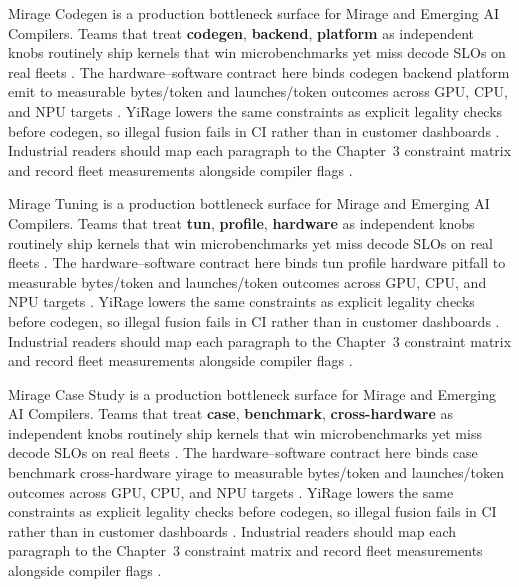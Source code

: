 Mirage Codegen is a production bottleneck surface for Mirage and Emerging AI Compilers. Teams that treat \textbf{codegen}, \textbf{backend}, \textbf{platform} as independent knobs routinely ship kernels that win microbenchmarks yet miss decode SLOs on real fleets \citep{semianalysis2024tma,dlbook}. The hardware--software contract here binds codegen backend platform emit to measurable bytes/token and launches/token outcomes across GPU, CPU, and NPU targets \citep{amd2024xdna,dao2022flashattention}. YiRage lowers the same constraints as explicit legality checks before codegen, so illegal fusion fails in CI rather than in customer dashboards \citep{amd2024aie,kwon2023vllm}. Industrial readers should map each paragraph to the Chapter~3 constraint matrix and record fleet measurements alongside compiler flags \citep{dlbook,nvidia2024cudagraphs}.

Mirage Tuning is a production bottleneck surface for Mirage and Emerging AI Compilers. Teams that treat \textbf{tun}, \textbf{profile}, \textbf{hardware} as independent knobs routinely ship kernels that win microbenchmarks yet miss decode SLOs on real fleets \citep{amd2024xdna,dao2022flashattention}. The hardware--software contract here binds tun profile hardware pitfall to measurable bytes/token and launches/token outcomes across GPU, CPU, and NPU targets \citep{amd2024aie,kwon2023vllm}. YiRage lowers the same constraints as explicit legality checks before codegen, so illegal fusion fails in CI rather than in customer dashboards \citep{dlbook,nvidia2024cudagraphs}. Industrial readers should map each paragraph to the Chapter~3 constraint matrix and record fleet measurements alongside compiler flags \citep{dao2022flashattention,liu2024deepseekv3}.

Mirage Case Study is a production bottleneck surface for Mirage and Emerging AI Compilers. Teams that treat \textbf{case}, \textbf{benchmark}, \textbf{cross-hardware} as independent knobs routinely ship kernels that win microbenchmarks yet miss decode SLOs on real fleets \citep{amd2024aie,kwon2023vllm}. The hardware--software contract here binds case benchmark cross-hardware yirage to measurable bytes/token and launches/token outcomes across GPU, CPU, and NPU targets \citep{dlbook,nvidia2024cudagraphs}. YiRage lowers the same constraints as explicit legality checks before codegen, so illegal fusion fails in CI rather than in customer dashboards \citep{dao2022flashattention,liu2024deepseekv3}. Industrial readers should map each paragraph to the Chapter~3 constraint matrix and record fleet measurements alongside compiler flags \citep{kwon2023vllm,patel2025llminference}.

